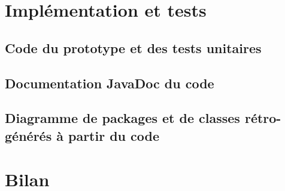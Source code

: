 \documentclass[10pt,a4paper]{book}
\begin{document}
\chapter{Implémentation et tests}
\section{Code du prototype et des tests unitaires}
\section{Documentation JavaDoc du code}
\section{Diagramme de packages et de classes rétro-générés à partir du code}
\chapter{Bilan}
\end{document}

